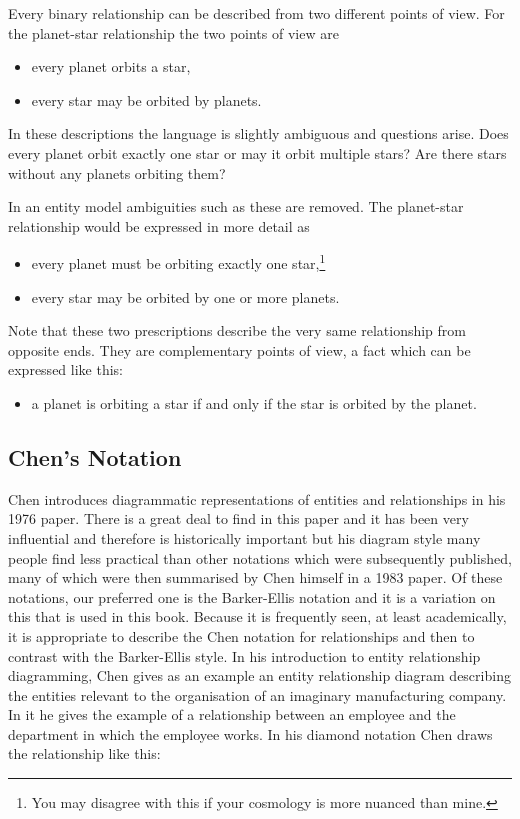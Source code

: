 \mynote 
Every binary relationship can be described from two different points of view. 
For the planet-star relationship the two points of view are
\begin{itemize}
\item every planet orbits a star,
\item every star may be orbited by planets.
\end{itemize}

In these descriptions the language is slightly ambiguous and questions arise.
Does every planet orbit exactly one star or may it orbit multiple stars? 
Are there stars without any planets orbiting them?

In an entity model ambiguities such as these are removed. 
The planet-star relationship would be expressed in more detail as
\begin{itemize}
\item every planet must be orbiting exactly one star,\footnote{You may disagree with this if your cosmology is more nuanced than mine.}
\item every star may be orbited by one or more planets.
\end{itemize}

Note that these two prescriptions describe the very same relationship from opposite ends. 
They are complementary points of view, a fact which  can be expressed like this:
\begin{itemize}
\item a planet is orbiting a star if and only if the star is orbited by the planet.
\end{itemize}
\subsection{Chen's Notation}
\mynote
Chen introduces diagrammatic representations of entities and relationships in his 
1976 paper. There is a great deal to find in this paper and it has been very influential and therefore is historically important but his diagram style many people find less practical than other notations which were subsequently published, 
many of which were then summarised by Chen himself in a 1983 paper. 
Of these notations, our preferred one is the Barker-Ellis notation and it is a variation on this that is used in this book. 
Because it is frequently seen, at least academically, it is appropriate
to describe the Chen notation for relationships and then to contrast with the Barker-Ellis style.
\mynote
In his introduction to entity relationship diagramming, Chen gives as an example an entity relationship diagram describing the entities relevant to the organisation of an imaginary manufacturing company.
In it he gives the example of a relationship between an employee and the department in which the employee works. In his diamond notation Chen draws the relationship like this:
\begin{center}
\scalebox{0.9}{}
\end{center}

